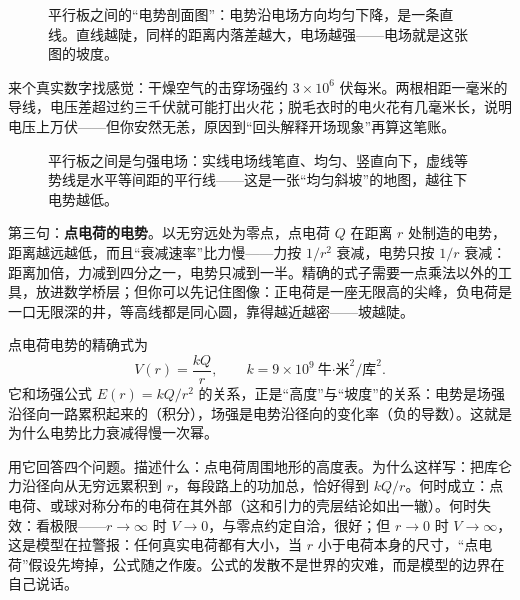 \begin{figure}[htbp]
\centering
{}
\caption{平行板之间的“电势剖面图”：电势沿电场方向均匀下降，是一条直线。直线越陡，同样的距离内落差越大，电场越强——电场就是这张图的坡度。}
\end{figure}

\begin{mainline}
来个真实数字找感觉：干燥空气的击穿场强约 \(3\times10^{6}\) 伏每米。两根相距一毫米的导线，电压差超过约三千伏就可能打出火花；脱毛衣时的电火花有几毫米长，说明电压上万伏——但你安然无恙，原因到“回头解释开场现象”再算这笔账。
\end{mainline}

\begin{figure}[htbp]
\centering
{}
\caption{平行板之间是匀强电场：实线电场线笔直、均匀、竖直向下，虚线等势线是水平等间距的平行线——这是一张“均匀斜坡”的地图，越往下电势越低。}
\end{figure}

\begin{mainline}
第三句：\textbf{点电荷的电势}。以无穷远处为零点，点电荷 \(Q\) 在距离 \(r\) 处制造的电势，距离越远越低，而且“衰减速率”比力慢——力按 \(1/r^2\) 衰减，电势只按 \(1/r\) 衰减：距离加倍，力减到四分之一，电势只减到一半。精确的式子需要一点乘法以外的工具，放进数学桥层；但你可以先记住图像：正电荷是一座无限高的尖峰，负电荷是一口无限深的井，等高线都是同心圆，靠得越近越密——坡越陡。
\end{mainline}

\begin{mathbridge}
点电荷电势的精确式为
\[
V(r) = \frac{kQ}{r},\qquad k = 9\times10^{9}\ \text{牛·米}^2/\text{库}^2 .
\]
它和场强公式 \(E(r) = kQ/r^2\) 的关系，正是“高度”与“坡度”的关系：电势是场强沿径向一路累积起来的（积分），场强是电势沿径向的变化率（负的导数）。这就是为什么电势比力衰减得慢一次幂。

用它回答四个问题。描述什么：点电荷周围地形的高度表。为什么这样写：把库仑力沿径向从无穷远累积到 \(r\)，每段路上的功加总，恰好得到 \(kQ/r\)。何时成立：点电荷、或球对称分布的电荷在其外部（这和引力的壳层结论如出一辙）。何时失效：看极限——\(r\to\infty\) 时 \(V\to 0\)，与零点约定自洽，很好；但 \(r\to 0\) 时 \(V\to\infty\)，这是模型在拉警报：任何真实电荷都有大小，当 \(r\) 小于电荷本身的尺寸，“点电荷”假设先垮掉，公式随之作废。公式的发散不是世界的灾难，而是模型的边界在自己说话。
\end{mathbridge}

